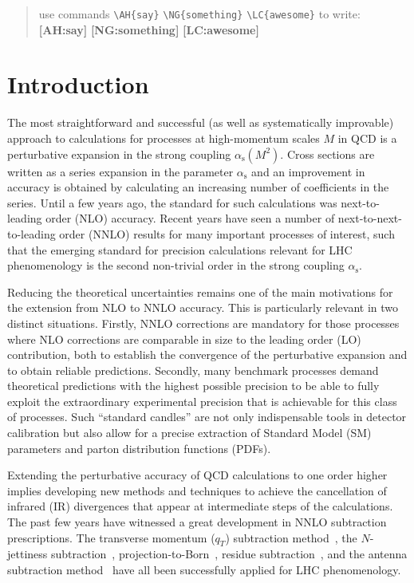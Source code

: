 \documentclass[12pt]{article}
\DeclareRobustCommand{\AH}[1]{\textbf{\quad\color{purple}[AH:\quad #1]}\xspace}
\DeclareRobustCommand{\NG}[1]{\textbf{\quad\color{blue}[NG:\quad #1]}\xspace}
\DeclareRobustCommand{\LC}[1]{\textbf{\quad\color{red}[LC:\quad #1]}\xspace}
\DeclareRobustCommand{\alphas}{\ensuremath{\alpha_{\mathrm{s}}}\xspace}
\DeclareRobustCommand{\as}{\alphas}
\DeclareRobustCommand{\qt}{\ensuremath{q_T}\xspace}
\begin{document}
\begin{titlepage}
\begin{quote}
use commands \verb|\AH{say}| \verb|\NG{something}| \verb|\LC{awesome}| to write: \AH{say} \NG{something} \LC{awesome}

\end{quote}
\end{titlepage}
\setcounter{footnote}{1}
\renewcommand{\thefootnote}{\fnsymbol{footnote}}

\section{Introduction}
\label{sec:intro}

The most straightforward and successful (as well as systematically improvable) approach to calculations for processes at high-momentum scales $M$ in QCD is a perturbative expansion in the strong coupling $\as(M^{2})$. Cross sections are written as a series expansion in the parameter $\as$ and an improvement in accuracy is obtained by calculating an increasing number of coefficients in the series. Until a few years ago, the standard for such calculations was next-to-leading order (NLO) accuracy. Recent years have seen a number of next-to-next-to-leading order (NNLO) results for many important processes of interest, such that the emerging standard for precision calculations relevant for LHC phenomenology is the second non-trivial order in the strong coupling $\as$.

Reducing the theoretical uncertainties remains one of the main motivations for the extension from NLO to NNLO accuracy. This is particularly relevant in two distinct situations. Firstly, NNLO corrections are mandatory for those processes where NLO corrections are comparable in size to the leading order (LO) contribution, both to establish the convergence of the perturbative expansion and to obtain reliable predictions. Secondly, many benchmark processes demand theoretical predictions with the highest possible precision to be able to fully exploit the extraordinary experimental precision that is achievable for this class of processes. Such ``standard candles'' are not only indispensable tools in detector calibration but also allow for a precise extraction of Standard Model (SM) parameters and parton distribution functions (PDFs).

Extending the perturbative accuracy of QCD calculations to one order higher implies developing new methods and techniques to achieve the cancellation of infrared (IR) divergences that appear at intermediate steps of the calculations. The past few years have witnessed a great development in NNLO subtraction prescriptions. The transverse momentum ($\qt$) subtraction method~\cite{Catani:2007vq,Bozzi:2005wk,Bonciani:2015sha}, the $N$-jettiness subtraction~\cite{Boughezal:2015eha, Gaunt:2015pea}, projection-to-Born~\cite{Cacciari:2015jma}, residue subtraction~\cite{Czakon:2011ve,Boughezal:2011jf}, and the antenna subtraction method~\cite{Antenna:method} have all been successfully applied for LHC phenomenology. 
\end{document}

